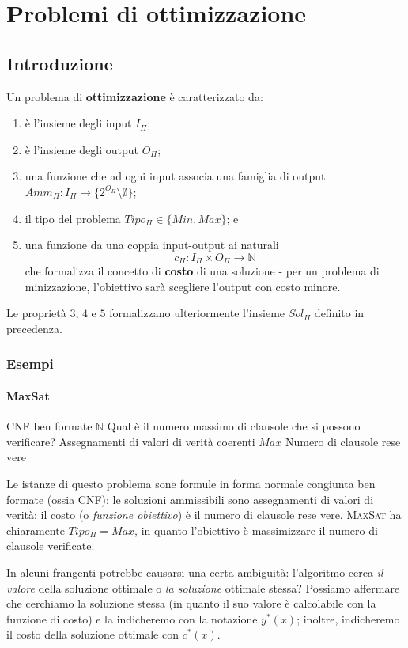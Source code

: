 \chapter{Problemi di ottimizzazione}
\section {Introduzione}
Un problema di \textbf{ottimizzazione} è caratterizzato da: 
\begin{enumerate}
  \item  è l'insieme degli input $I_{\Pi}$;
  \item  è l'insieme degli output $O_{\Pi}$;
  \item  una funzione che ad ogni input associa una famiglia di output: $Amm_{\Pi} : I_{\Pi} \rightarrow \{2^{O_{\Pi}} \setminus \emptyset \}$;
  \item il tipo del problema $Tipo_{\Pi} \in \{Min, Max\}$; e
  \item una funzione da una coppia input-output ai naturali
    $$
	c_{\Pi}: I_{\Pi}\times O_{\Pi} \rightarrow \mathbb{N}
    $$
    che formalizza il concetto di \textbf{costo} di una soluzione - per un problema 
    di minizzazione, l'obiettivo sarà scegliere l'output con costo minore. 

\end{enumerate}
Le proprietà $3$, $4$ e $5$ formalizzano ulteriormente l'insieme $Sol_{\Pi}$ definito in precedenza. 
\subsection{Esempi}
\subsubsection{MaxSat}

{CNF ben formate}
{$\mathbb{N}$} 
{Qual è il numero massimo di clausole che si possono verificare?} 
{Assegnamenti di valori di verità coerenti} 
{$Max$}
{Numero di clausole rese vere}

\noindent
Le istanze di questo problema sone formule in forma normale congiunta ben formate
(ossia CNF); le soluzioni ammissibili sono assegnamenti di valori di verità; 
il costo (o \textit{funzione obiettivo}) è il numero di clausole rese vere. 
\textsc{MaxSat} ha chiaramente $Tipo_{\Pi} = Max$, in quanto 
l'obiettivo è massimizzare il numero di clausole verificate.

In alcuni frangenti potrebbe causarsi una certa ambiguità: 
l'algoritmo cerca \textit{il valore} della soluzione ottimale o \textit{la soluzione} ottimale stessa? 
Possiamo affermare che cerchiamo la soluzione stessa (in quanto il suo valore 
è calcolabile con la funzione di costo) e la indicheremo con la notazione $y^*(x)$; 
inoltre, indicheremo il costo della soluzione ottimale con $c^*(x)$.

